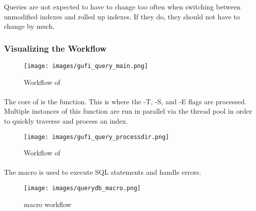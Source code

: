 Queries are not expected to have to change too often when switching
between unmodified indexes and rolled up indexes. If they do, they
should not have to change by much.

\subsubsection{Visualizing the Workflow}
\begin{figure}[H]
  \centering
  \texttt{[image: images/gufi\_query\_main.png]}
  \caption{Workflow of \gufiquery}
\end{figure}

\paragraph{\processdir}
The core of \gufiquery is the \processdir function. This is where the
-T, -S, and -E flags are processed. Multiple instances of this
function are run in parallel via the thread pool in order to quickly
traverse and process an index.

\begin{figure}[H]
  \centering
  \texttt{[image: images/gufi\_query\_processdir.png]}
  \caption{Workflow of \processdir}
\end{figure}

\paragraph{\querydb}
The \querydb macro is used to execute SQL statements and handle errors.

\begin{figure}[H]
  \centering
  \texttt{[image: images/querydb\_macro.png]}
  \caption{\querydb macro workflow}
\end{figure}
